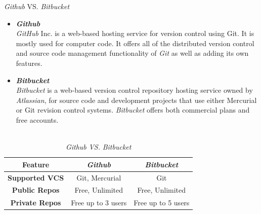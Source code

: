 \documentclass[
 size=12pt,
 paper=smartboard, %
 mode=present, %
 display=slides, %
style=tuliplab,
pauseslide,
fleqn,leqno]{powerdot}
\begin{document}

\begin{slide}{\textit{Github} VS. \textit{Bitbucket}}	
	\begin{itemize}
		\item \textbf{\textit{Github}}\\ 
		\textit{GitHub} Inc. 
		is a web-based hosting service for version control using Git. 
		It is mostly used for computer code. 
		It offers all of the distributed version control and source code management 
		functionality of \textit{Git} as well as adding its own features.
		
		\item \textbf{\textit{Bitbucket}}\\
		\textit{Bitbucket} is a web-based version control repository 
		hosting service owned by \textit{Atlassian}, 
		for source code and development projects that use either 
		Mercurial or Git revision control systems. 
		\textit{Bitbucket} offers both commercial plans and free accounts.\\~\\
	\end{itemize}
	\begin{table}
		\caption{\textit{Github}  \textit{VS.}  \textit{Bitbucket}}\label{GithubvsBitbucket}
		\begin{tabular}{ c | c | c }
			\toprule
			\textbf{Feature}  & \textbf{\textit{Github}} & \textbf{\textit{Bitbucket}}\\
			\midrule
			\textbf{Supported VCS}
			&  Git, Mercurial   
			&  Git \\
			\textbf{Public Repos}
			&  Free, Unlimited
			&  Free, Unlimited \\
			\textbf{Private Repos}
			&  Free up to 3 users
			&  Free up to 5 users \\
			\bottomrule
		\end{tabular}
	\end{table}
\end{slide}
\end{document}
